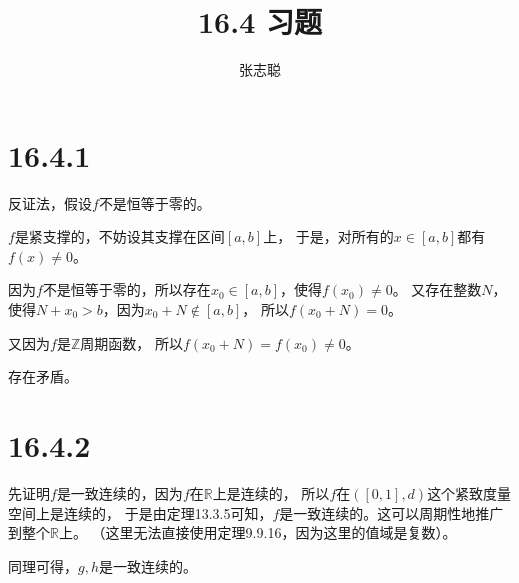 \documentclass{article}
\begin{document}
\title{16.4 习题}
\author{张志聪}
\maketitle

\section*{16.4.1}

反证法，假设$f$不是恒等于零的。

$f$是紧支撑的，不妨设其支撑在区间$[a, b]$上，
于是，对所有的$x \in [a, b]$都有$f(x) \neq 0$。

因为$f$不是恒等于零的，所以存在$x_0 \in [a, b]$，使得$f(x_0) \neq 0$。
又存在整数$N$，使得$N + x_0 > b$，因为$x_0 + N \notin [a, b]$，
所以$f(x_0 + N) = 0$。

又因为$f$是$\mathbb{Z}$周期函数，
所以$f(x_0 + N) = f(x_0) \neq 0$。

存在矛盾。

\section*{16.4.2}

先证明$f$是一致连续的，因为$f$在$\mathbb{R}$上是连续的，
所以$f$在$([0, 1], d)$这个紧致度量空间上是连续的，
于是由定理13.3.5可知，$f$是一致连续的。这可以周期性地推广到整个$\mathbb{R}$上。
（这里无法直接使用定理9.9.16，因为这里的值域是复数）。

同理可得，$g,h$是一致连续的。
\end{document}
